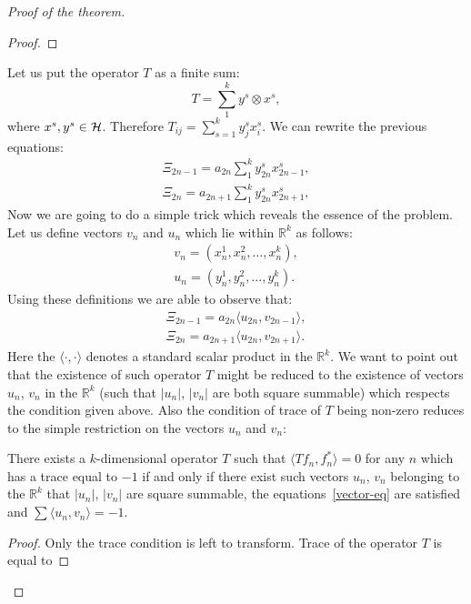 \begin{proof}[Proof of the theorem]
\begin{proof}
        \end{proof}
        Let us put the operator $T$ as a finite sum:
        $$
            T = \sum_1^k y^s \otimes x^s,
        $$
        where $x^s, y^s \in \cal{H}$.
        Therefore $T_{ij} = \sum_{s=1}^k {y^s_j x^s_i}$. We can rewrite the previous equations:
        \begin{align*}
            \Xi_{2n-1} = a_{2n} \sum_1^k y^s_{2n} x^s_{2n - 1},\\
            \Xi_{2n} = a_{2n + 1} \sum_1^k y^s_{2n} x^s_{2n + 1},
        \end{align*}
        Now we are going to do a simple trick which reveals the essence of the problem.
        Let us define vectors $v_n$ and $u_n$ which lie within $\mathbb{R}^k$ as follows:
        \begin{align*}
            v_n = (x^1_n, x^2_n, \dots ,x^k_n),\\
            u_n = (y^1_n, y^2_n, \dots ,y^k_n). 
        \end{align*}
        Using these definitions we are able to observe that:
        \begin{align}
            \label{vector-eq}
            \Xi_{2n-1} = a_{2n} \langle u_{2n}, v_{2n - 1}\rangle,\\
            \Xi_{2n} = a_{2n + 1} \langle u_{2n}, v_{2n + 1}\rangle.
        \end{align}
        Here the $\langle\cdot, \cdot\rangle$ denotes a standard scalar product in the $\mathbb{R}^k$.
        We want to point out that the existence of such operator $T$
        might be reduced to the existence of vectors $u_n$, $v_n$ in the $\mathbb{R}^k$ (such that $|u_n|$, $|v_n|$ are both square summable) which respects the condition given above.
        Also the condition of trace of $T$ being non-zero reduces to the simple restriction on the vectors $u_n$ and $v_n$:
        \begin{prop}
            There exists a $k$-dimensional operator $T$ such that $\langle Tf_n, f_n^*\rangle  = 0$ for any $n$
            which has a trace equal to $-1$ if and only if there exist such vectors $u_n$, $v_n$ belonging to the
            $\mathbb{R}^k$ that $|u_n|$, $|v_n|$ are square summable, the equations~\eqref{vector-eq} are satisfied and
            $\sum \langle u_n,v_n \rangle = -1$. 
        \end{prop}
        \begin{proof}
            Only the trace condition is left to transform.
            Trace of the operator $T$ is equal to

\end{proof}
\end{proof}
